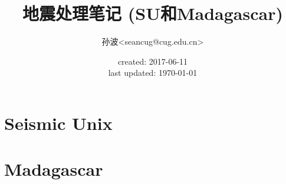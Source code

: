 \documentclass[a4paper]{ctexbook}
\title{地震处理笔记 (SU和Madagascar)}
\author{孙波<seancug@cug.edu.cn>}
\date{created: 2017-06-11 \\ last updated: \today}
\begin{document}
	\maketitle
	
	\tableofcontents
	
	\part{Seismic Unix}
	
	
	
	
	
	
	
	
	\part{Madagascar}
	
\end{document}
